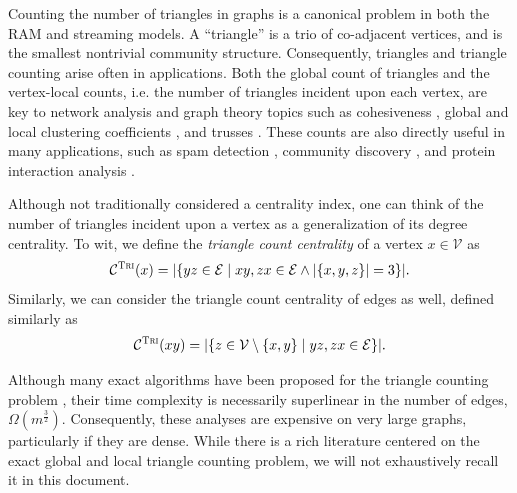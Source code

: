 \documentclass{report}
\newcommand{\algoname}[1]{\textnormal{\textsc{#1}}}
\begin{document}
Counting the number of triangles in graphs is a canonical problem in both the RAM and streaming models.
A ``triangle'' is a trio of co-adjacent vertices, and is the smallest nontrivial community structure.
Consequently, triangles and triangle counting arise often in applications.
Both the global count of triangles and the vertex-local counts, i.e. the number of triangles incident upon each vertex, are key to network analysis and graph theory topics such as cohesiveness \cite{lim2015mascot}, global and local clustering coefficients \cite{tsourakakis2008fast}, and trusses \cite{cohen2008trusses}.
These counts are also directly useful in many applications, such as spam detection \cite{becchetti2010efficient},  community discovery \cite{wang2010triangulation, berry2011tolerating}, and protein interaction analysis \cite{milo2002network}.

Although not traditionally considered a centrality index, one can think of the number of triangles incident upon a vertex as a generalization of its degree centrality. 
To wit, we define the \emph{triangle count centrality} of a vertex $x \in \mathcal{V}$ as
%
\begin{equation}
	\mathcal{C}^{\algoname{Tri}}(x) = |\{yz \in \mathcal{E} \mid xy, zx \in \mathcal{E} \wedge |\{x, y, z\}| = 3\}|.
\end{equation}
%
Similarly, we can consider the triangle count centrality of edges as well, defined similarly as
%
\begin{equation}
	\mathcal{C}^{\algoname{Tri}}(xy) = |\{z \in \mathcal{V} \setminus \{x,y\} \mid yz, zx \in \mathcal{E}\}|.
\end{equation}
%

Although many exact algorithms have been proposed for the triangle counting problem \cite{tsourakakis2008fast, becchetti2010efficient, chu2011triangle, suri2011counting, wolf2017fast}, their time complexity is necessarily superlinear in the number of edges, $\Omega(m^{
\frac{3}{2}})$.
Consequently, these analyses are expensive on very large graphs, particularly if they are dense.
While there is a rich literature centered on the exact global and local triangle counting problem, we will not exhaustively recall it in this document.
\end{document}
